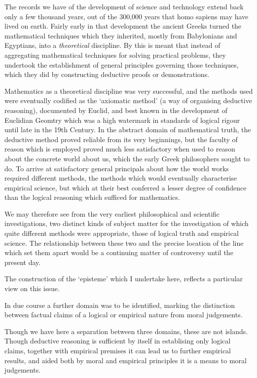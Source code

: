 \documentclass[10pt,titlepage]{article}
\begin{document}
The records we have of the development of science and technology extend back only a few thousand years, out of the 300,000 years that homo sapiens may have lived on earth.
Fairly early in that development the ancient Greeks turned the mathematical techniques which they inherited, mostly from Babylonians and Egyptians, into a \emph{theoretical} discipline.
By this is meant that instead of aggregating mathematical techniques for solving practical problems, they undertook the establishment of general principles governing those techniques, which they did by constructing deductive proofs or demonstrations.

Mathematics as a theoretical discipline was very successful, and the methods used were eventually codified as the `axiomatic method' (a way of organising deductive reasoning), documented by Euclid, and best known in the development of Euclidian Geomtry which was a high watermark in standards of logical rigour until late in the 19th Century.
In the abstract domain of mathematical truth, the deductive method proved reliable from its very beginnings, but the faculty of reason which is employed proved much less satisfactory when used to reason about the concrete world about us, which the early Greek philosophers sought to do.
To arrive at satisfactory general principals about how the world works required different methods, the methods which would eventually characterise empirical science, but which at their best conferred a lesser degree of confidence than the logical reasoning which sufficed for mathematics.

We may therefore see from the very earliest philosophical and scientific investigations, two distinct kinds of subject matter for the investigation of which quite different methods were appropriate, those of logical truth and empirical science.
The relationship between these two and the precise location of the line which set them apart would be a continuing matter of controversy until the present day.

The construction of the `episteme' which I undertake here, reflects a particular view on this issue.

In due course a further domain was to be identified, marking the distinction between factual claims of a logical or empirical nature from moral judgements.

Though we have here a separation between three domains, these are not islands.
Though deductive reasoning is sufficient by itself in establising only logical claims, together with empirical premises it can lead us to further empirical results, and aided both by moral and empirical principles it is a means to moral judgements.
\end{document}
